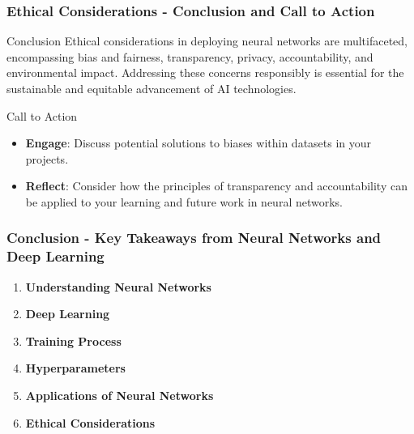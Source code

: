 \documentclass[aspectratio=169]{beamer}
\begin{document}
\begin{frame}[fragile]
    \frametitle{Ethical Considerations - Conclusion and Call to Action}
    \begin{block}{Conclusion}
        Ethical considerations in deploying neural networks are multifaceted, encompassing bias and fairness, transparency, privacy, accountability, and environmental impact. Addressing these concerns responsibly is essential for the sustainable and equitable advancement of AI technologies.
    \end{block}
    
    \begin{block}{Call to Action}
        \begin{itemize}
            \item \textbf{Engage}: Discuss potential solutions to biases within datasets in your projects.
            \item \textbf{Reflect}: Consider how the principles of transparency and accountability can be applied to your learning and future work in neural networks.
        \end{itemize}
    \end{block}
\end{frame}

\begin{frame}[fragile]
    \frametitle{Conclusion - Key Takeaways from Neural Networks and Deep Learning}
    
    \begin{enumerate}
        \item \textbf{Understanding Neural Networks}
        \item \textbf{Deep Learning}
        \item \textbf{Training Process}
        \item \textbf{Hyperparameters}
        \item \textbf{Applications of Neural Networks}
        \item \textbf{Ethical Considerations}
    \end{enumerate}
\end{frame}
\end{document}
